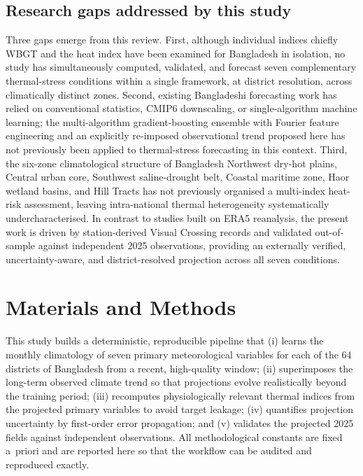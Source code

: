 \documentclass[review,11pt]{elsarticle}
\begin{document}
\subsection{Research gaps addressed by this study}
Three gaps emerge from this review. First, although individual indices chiefly
WBGT and the heat index have been examined for Bangladesh in isolation, no study
has simultaneously computed, validated, and forecast seven complementary
thermal-stress conditions within a single framework, at district resolution, across
climatically distinct zones. Second, existing Bangladeshi forecasting work has
relied on conventional statistics, CMIP6 downscaling, or single-algorithm machine
learning; the multi-algorithm gradient-boosting ensemble with Fourier feature
engineering and an explicitly re-imposed observational trend proposed here has not
previously been applied to thermal-stress forecasting in this context. Third, the
six-zone climatological structure of Bangladesh Northwest dry-hot plains, Central
urban core, Southwest saline-drought belt, Coastal maritime zone, Haor wetland
basins, and Hill Tracts has not previously organised a multi-index heat-risk
assessment, leaving intra-national thermal heterogeneity systematically
undercharacterised. In contrast to studies built on ERA5 reanalysis, the present
work is driven by station-derived Visual Crossing records and validated
out-of-sample against independent 2025 observations, providing an externally
verified, uncertainty-aware, and district-resolved projection across all seven
conditions.

\section{Materials and Methods}\label{sec:methods}

This study builds a deterministic, reproducible pipeline that (i) learns the
monthly climatology of seven primary meteorological variables for each of the
64 districts of Bangladesh from a recent, high-quality window; (ii) superimposes
the long-term observed climate trend so that projections evolve realistically
beyond the training period; (iii) recomputes physiologically relevant thermal
indices from the projected primary variables to avoid target leakage; (iv)
quantifies projection uncertainty by first-order error propagation; and (v)
validates the projected 2025 fields against independent observations. All
methodological constants are fixed a~priori and are reported here so that the
workflow can be audited and reproduced exactly.
\end{document}
